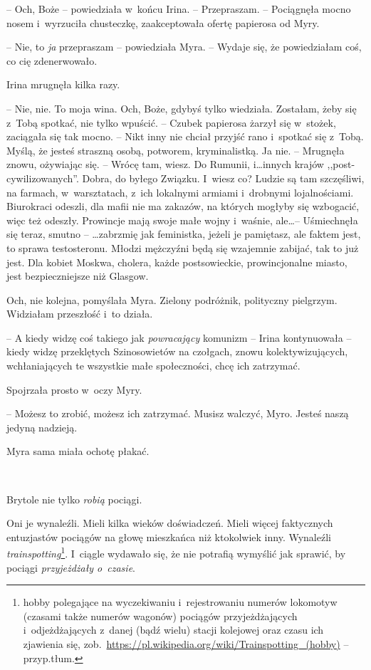 \documentclass[oneside,polish,11pt,sfheadings]{mwbk}
\begin{document}
-- Och, Boże -- powiedziała w~końcu Irina. -- Przepraszam. -- Pociągnęła
mocno nosem i~wyrzuciła chusteczkę, zaakceptowała ofertę papierosa od
Myry.

-- Nie, to \textit{ja} przepraszam -- powiedziała Myra. -- Wydaje się, że
powiedziałam coś, co cię zdenerwowało.

Irina mrugnęła kilka razy. 

-- Nie, nie. To moja wina. Och, Boże, gdybyś
tylko wiedziała. Zostałam, żeby się z~Tobą spotkać, nie tylko wpuścić. -- Czubek papierosa żarzył się w~stożek, zaciągała się tak mocno. -- Nikt
inny nie chciał przyjść rano i~spotkać się z~Tobą. Myślą, że jesteś
straszną osobą, potworem, kryminalistką. Ja nie. -- Mrugnęła znowu,
ożywiając się. -- Wrócę tam, wiesz. Do Rumunii, i\ldots innych krajów
,,post-cywilizowanych''. Dobra, do byłego Związku. I~wiesz co? Ludzie są
tam szczęśliwi, na farmach, w~warsztatach, z~ich lokalnymi armiami i~drobnymi lojalnościami. Biurokraci odeszli, dla mafii nie ma zakazów, na
których mogłyby się wzbogacić, więc też odeszły. Prowincje mają swoje
małe wojny i~waśnie, ale\ldots -- Uśmiechnęła się teraz, smutno -- \ldots zabrzmię
jak feministka, jeżeli je pamiętasz, ale faktem jest, to sprawa
testosteronu. Młodzi mężczyźni będą się wzajemnie zabijać, tak to już
jest. Dla kobiet Moskwa, cholera, każde postsowieckie, prowincjonalne
miasto, jest bezpieczniejsze niż Glasgow.

Och, nie kolejna, pomyślała Myra. Zielony podróżnik, polityczny
pielgrzym. Widziałam przeszłość i~to działa.

-- A kiedy widzę coś takiego jak \textit{powracający} komunizm -- Irina
kontynuowała -- kiedy widzę przeklętych Szinosowietów na czołgach, znowu
kolektywizujących, wchłaniających te wszystkie małe społeczności, chcę
ich zatrzymać.

Spojrzała prosto w~oczy Myry. 

-- Możesz to zrobić, możesz ich zatrzymać.
Musisz walczyć, Myro. Jesteś naszą jedyną nadzieją.

Myra sama miała ochotę płakać.

~

Brytole nie tylko \textit{robią} pociągi.

Oni je wynaleźli. Mieli kilka wieków doświadczeń. Mieli więcej
faktycznych entuzjastów pociągów na głowę mieszkańca niż ktokolwiek
inny. Wynaleźli \textit{trainspotting}\footnote{ hobby polegające na
wyczekiwaniu i~rejestrowaniu numerów lokomotyw (czasami także numerów
wagonów) pociągów przyjeżdżających i~odjeżdżających z~danej (bądź wielu)
stacji kolejowej oraz czasu ich zjawienia się,
zob.~\url{https://pl.wikipedia.org/wiki/Trainspotting\_(hobby)}
-- przyp.tłum.}. I~ciągle wydawało się, że nie potrafią wymyślić jak
sprawić, by pociągi \textit{przyjeżdżały o~czasie}.
\end{document}
